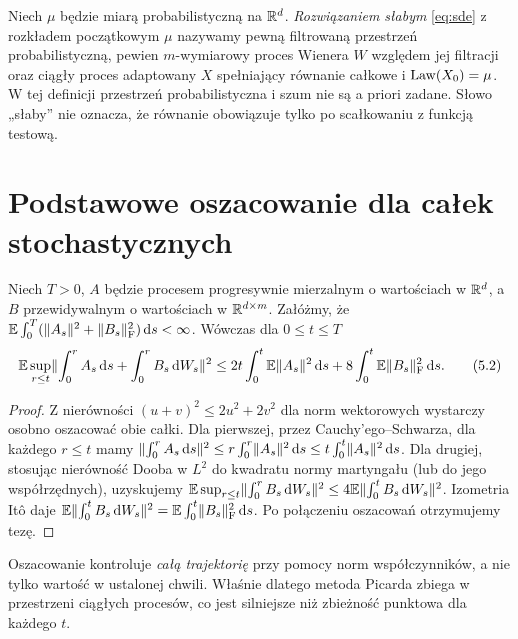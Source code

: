 \begin{definicja}
Niech $\mu$ będzie miarą probabilistyczną na $\mathbb{R}^d$.
\emph{Rozwiązaniem słabym} \eqref{eq:sde} z rozkładem
początkowym $\mu$ nazywamy pewną filtrowaną przestrzeń
probabilistyczną, pewien $m$-wymiarowy proces Wienera $W$
względem jej filtracji oraz ciągły proces adaptowany $X$
spełniający równanie całkowe i $\operatorname{Law}(X_0)=\mu$.
W tej definicji przestrzeń probabilistyczna i szum nie są
a priori zadane. Słowo „słaby” nie oznacza, że równanie
obowiązuje tylko po scałkowaniu z funkcją testową.
\end{definicja}

\section{Podstawowe oszacowanie dla całek stochastycznych}
\begin{lemat}
\label{lem:sde-sup}
Niech $T>0$, $A$ będzie procesem progresywnie mierzalnym
o wartościach w $\mathbb{R}^d$, a $B$ przewidywalnym o wartościach
w $\mathbb{R}^{d\times m}$. Załóżmy, że
$\mathbb{E}\int_0^T(\lVert A_s\rVert^2+\lVert B_s\rVert_{\mathrm F}^2)\,\mathrm{d} s<\infty$.
Wówczas dla $0\le t\le T$
\[
\mathbb{E}\sup_{r\le t}\lVert \int_0^r A_s\,\mathrm{d} s+
\int_0^r B_s\,\mathrm{d} W_s\rVert^2
\le 2t\int_0^t\mathbb{E}\lVert A_s\rVert^2\,\mathrm{d} s
+8\int_0^t\mathbb{E}\lVert B_s\rVert_{\mathrm F}^2\,\mathrm{d} s.
\tag{5.2}\label{eq:sde-basic-est}
\]
\end{lemat}
\begin{proof}
Z nierówności $(u+v)^2\le2u^2+2v^2$ dla norm wektorowych
wystarczy osobno oszacować obie całki. Dla pierwszej,
przez Cauchy'ego--Schwarza, dla każdego $r\le t$ mamy
$\lVert \int_0^r A_s\,\mathrm{d} s\rVert^2
\le r\int_0^r\lVert A_s\rVert^2\,\mathrm{d} s
\le t\int_0^t\lVert A_s\rVert^2\,\mathrm{d} s$.
Dla drugiej, stosując nierówność Dooba w $L^2$
do kwadratu normy martyngału (lub do jego współrzędnych),
uzyskujemy
$\mathbb{E}\sup_{r\le t}\lVert \int_0^rB_s\,\mathrm{d} W_s\rVert^2
\le4\mathbb{E}\lVert \int_0^tB_s\,\mathrm{d} W_s\rVert^2$.
Izometria Itô daje $\mathbb{E}\lVert \int_0^tB_s\,\mathrm{d} W_s\rVert^2
=\mathbb{E}\int_0^t\lVert B_s\rVert_{\mathrm F}^2\,\mathrm{d} s$.
Po połączeniu oszacowań otrzymujemy tezę.
\end{proof}

\begin{uwaga}
Oszacowanie kontroluje \emph{całą trajektorię} przy pomocy
norm współczynników, a nie tylko wartość w ustalonej chwili.
Właśnie dlatego metoda Picarda zbiega w przestrzeni
ciągłych procesów, co jest silniejsze niż zbieżność
punktowa dla każdego $t$.
\end{uwaga}

